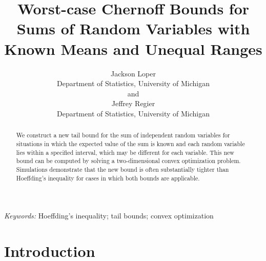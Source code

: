 \documentclass[12pt]{article}
\theoremstyle{plain}
\begin{document}
%

\def\spacingset#1{\renewcommand{\baselinestretch}%
{#1}\small\normalsize} \spacingset{1}



\title{\bf Worst-case Chernoff Bounds for Sums of Random Variables with Known Means and Unequal Ranges}
\author{Jackson Loper\\
Department of Statistics, University of Michigan\\
and \\
Jeffrey Regier \\
Department of Statistics, University of Michigan}
\maketitle


\bigskip
\begin{abstract}
We construct a new tail bound for the sum of independent random variables for situations in which the expected value of the sum is known and each random variable lies within a specified interval, which may be different for each variable.  This new bound can be computed by solving a two-dimensional convex optimization problem.  Simulations demonstrate that the new bound is often substantially tighter than Hoeffding's inequality for cases in which both bounds are applicable.
\end{abstract}

\noindent%
{\it Keywords:}  Hoeffding's inequality; tail bounds; convex optimization
\vfill

\newpage
\spacingset{1.45} %




\section{Introduction}
\end{document}
